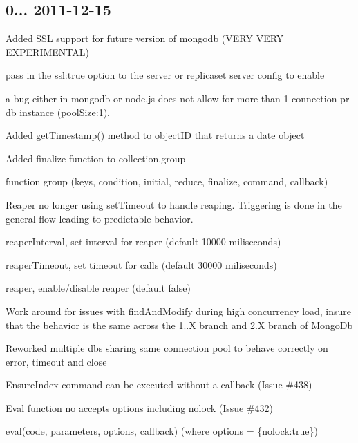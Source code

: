 \subsection*{0... 2011-\/12-\/15 }


\begin{DoxyItemize}
\item Added S\+SL support for future version of mongodb (V\+E\+RY V\+E\+RY E\+X\+P\+E\+R\+I\+M\+E\+N\+T\+AL)
\begin{DoxyItemize}
\item pass in the ssl\+:true option to the server or replicaset server config to enable
\item a bug either in mongodb or node.\+js does not allow for more than 1 connection pr db instance (pool\+Size\+:1).
\end{DoxyItemize}
\item Added get\+Timestamp() method to object\+ID that returns a date object
\item Added finalize function to collection.\+group
\begin{DoxyItemize}
\item function group (keys, condition, initial, reduce, finalize, command, callback)
\end{DoxyItemize}
\item Reaper no longer using set\+Timeout to handle reaping. Triggering is done in the general flow leading to predictable behavior.
\begin{DoxyItemize}
\item reaper\+Interval, set interval for reaper (default 10000 miliseconds)
\item reaper\+Timeout, set timeout for calls (default 30000 miliseconds)
\item reaper, enable/disable reaper (default false)
\end{DoxyItemize}
\item Work around for issues with find\+And\+Modify during high concurrency load, insure that the behavior is the same across the 1..\+X branch and 2.\+X branch of Mongo\+Db
\item Reworked multiple db\textquotesingle{}s sharing same connection pool to behave correctly on error, timeout and close
\item Ensure\+Index command can be executed without a callback (Issue \#438)
\item Eval function no accepts options including nolock (Issue \#432)
\begin{DoxyItemize}
\item eval(code, parameters, options, callback) (where options = \{nolock\+:true\})
\end{DoxyItemize}
\end{DoxyItemize}

